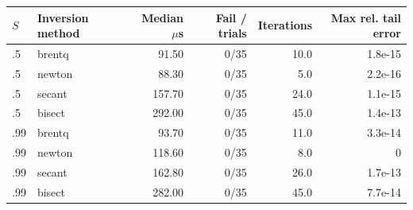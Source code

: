 \begin{tabular}{llrrrr}
\toprule
$S$ & Inversion method & Median $\mu$s & Fail / trials & Iterations & Max rel. tail error \\
\midrule
.5 & brentq & 91.50 & 0/35 & 10.0 & 1.8e-15 \\
.5 & newton & 88.30 & 0/35 & 5.0 & 2.2e-16 \\
.5 & secant & 157.70 & 0/35 & 24.0 & 1.1e-15 \\
.5 & bisect & 292.00 & 0/35 & 45.0 & 1.4e-13 \\
.99 & brentq & 93.70 & 0/35 & 11.0 & 3.3e-14 \\
.99 & newton & 118.60 & 0/35 & 8.0 & 0 \\
.99 & secant & 162.80 & 0/35 & 26.0 & 1.7e-13 \\
.99 & bisect & 282.00 & 0/35 & 45.0 & 7.7e-14 \\
\bottomrule
\end{tabular}
